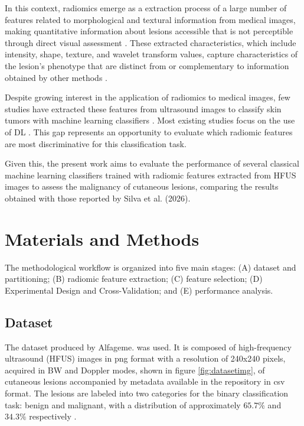 \documentclass[12pt,a4paper]{article}
\begin{document}
In this context, radiomics emerge as a extraction process of a large number of features related to morphological and textural information from medical images, making quantitative information about lesions accessible that is not perceptible through direct visual assessment \cite{Lambin2017}. These extracted characteristics, which include intensity, shape, texture, and wavelet transform values, capture characteristics of the lesion's phenotype that are distinct from or complementary to information obtained by other methods \cite{Lambin2017}.

Despite growing interest in the application of radiomics to medical images, few studies have extracted these features from ultrasound images to classify skin tumors with machine learning classifiers \cite{Qin2025}. Most existing studies focus on the use of DL \cite{Surkov2024, Bibi2026, Czajkowska2021-2}. This gap represents an opportunity to evaluate which radiomic features are most discriminative for this classification task.

Given this, the present work aims to evaluate the performance of several classical machine learning classifiers trained with radiomic features extracted from HFUS images to assess the malignancy of cutaneous lesions, comparing the results obtained with those reported by Silva et al. (2026). 

\section{Materials and Methods}

The methodological workflow is organized into five main stages: (A) dataset and partitioning; (B) radiomic feature extraction; (C) feature selection; (D) Experimental Design and Cross-Validation; and (E) performance analysis.

\subsection{Dataset}

The dataset produced by Alfageme. \cite{BANCO2022} was used. It is composed of high-frequency ultrasound (HFUS) images in png format with a resolution of 240x240 pixels, acquired in BW and Doppler modes, shown in figure \ref{fig:datasetimg}, of cutaneous lesions accompanied by metadata available in the repository in csv format. The lesions are labeled into two categories for the binary classification task: benign and malignant, with a distribution of approximately $65.7\%$ and $34.3\%$ respectively \cite{daSilva2026}.
\end{document}
